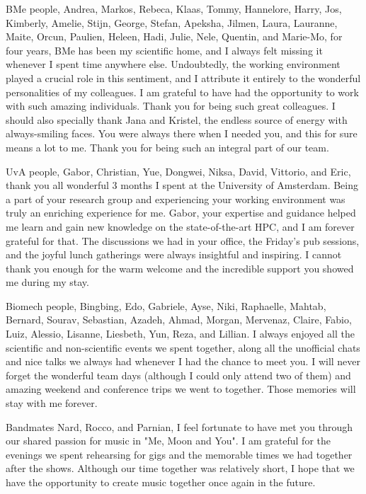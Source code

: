 BMe people, Andrea, Markos, Rebeca, Klaas, Tommy, Hannelore, Harry, Jos, Kimberly, Amelie, Stijn, George, Stefan, Apeksha,  Jilmen, Laura, Lauranne, Maite, Orcun, Paulien, Heleen, Hadi, Julie, Nele, Quentin, and Marie-Mo, for four years, BMe has been my scientific home, and I always felt missing it whenever I spent time anywhere else. Undoubtedly, the working environment played a crucial role in this sentiment, and I attribute it entirely to the wonderful personalities of my colleagues. I am grateful to have had the opportunity to work with such amazing individuals. Thank you for being such great colleagues. I should also specially thank Jana and Kristel, the endless source of energy with always-smiling faces. You were always there when I needed you, and this for sure means a lot to me. Thank you for being such an integral part of our team.

UvA people, Gabor, Christian, Yue, Dongwei, Niksa, David, Vittorio, and Eric, thank you all wonderful 3 months I spent at the University of Amsterdam. Being a part of your research group and experiencing your working environment was truly an enriching experience for me. Gabor, your expertise and guidance helped me learn and gain new knowledge on the state-of-the-art HPC, and I am forever grateful for that. The discussions we had in your office, the Friday's pub sessions, and the joyful lunch gatherings were always insightful and inspiring. I cannot thank you enough for the warm welcome and the incredible support you showed me during my stay.

Biomech people, Bingbing, Edo, Gabriele, Ayse, Niki, Raphaelle, Mahtab, Bernard, Sourav, Sebastian, Azadeh, Ahmad, Morgan, Mervenaz, Claire, Fabio, Luiz, Alessio, Lisanne, Liesbeth, Yun, Reza, and Lillian. I always enjoyed all the scientific and non-scientific events we spent together, along all the unofficial chats and nice talks we always had whenever I had the chance to meet you. I will never forget the wonderful team days (although I could only attend two of them) and amazing weekend and conference trips we went to together. Those memories will stay with me forever.

Bandmates Nard, Rocco, and Parnian, I feel fortunate to have met you through our shared passion for music in "Me, Moon and You". I am grateful for the evenings we spent rehearsing for gigs and the memorable times we had together after the shows. Although our time together was relatively short, I hope that we have the opportunity to create music together once again in the future.

